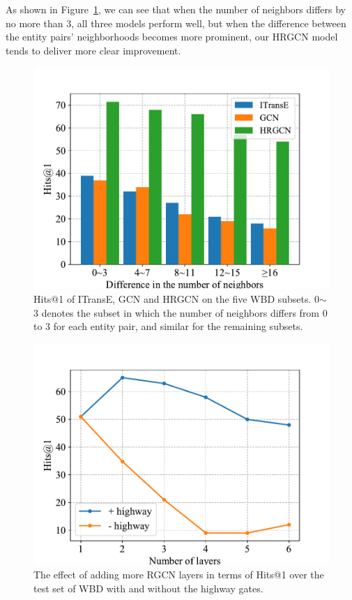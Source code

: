 	As shown in Figure~\ref{subset}, we can see that when the number of neighbors differs by no more than 3, all three models perform well,
	but when the difference between the entity pairs' neighborhoods becomes more prominent,
	our HRGCN model tends to deliver more clear improvement.
	\begin{figure}
	\begin{center}
		\includegraphics[width=1\linewidth]{figures/graph4.pdf}
		\caption{Hits@1 of ITransE, GCN and HRGCN on the five WBD subsets. 0$\sim$3 denotes the subset in which the number of neighbors differs from 0 to 3 for each entity pair, and similar for the remaining subsets.}
		\label{subset}
	\end{center}
\end{figure}
	\begin{figure}
		\begin{center}
			\includegraphics[width=1\linewidth]{figures/graph3.pdf}
			\caption{The effect of adding more RGCN layers in terms of Hits@1 over the test set of WBD with and without the highway gates.}
			\label{highway}
		\end{center}
	\end{figure}
